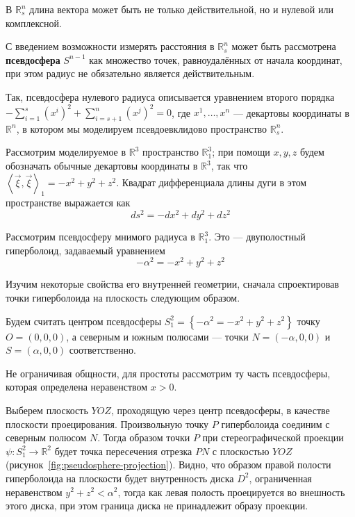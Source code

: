 \documentclass{article}
\numberwithin{equation}{section}
\newcommand{\neword}[1]{\textbf{#1}}
\newcommand{\scalmult}[2]{{\left \langle #1 \right \rangle}_{#2}}
\begin{document}
В $\mathbb{R}^n_s$ длина вектора может быть не только действительной,
но и нулевой или комплексной.

С введением возможности измерять расстояния в $\mathbb{R}^n_s$ может
быть рассмотрена \neword{псевдосфера} $S^{n-1}$ как множество точек,
равноудалённых от начала координат, при этом радиус не обязательно
является действительным.

Так, псевдосфера нулевого радиуса описывается уравнением второго порядка
$-\sum_{i=1}^s\left (x^i \right)^2 + \sum_{i=s+1}^n\left(x^j \right)^2 = 0$, где
$x^1, \dotsc, x^n $ — декартовы координаты в $\mathbb{R}^n$, в котором
мы моделируем псевдоевклидово пространство $\mathbb{R}^n_s$.

Рассмотрим моделируемое в $\mathbb{R}^3$ пространство
$\mathbb{R}^3_1$; при помощи $x, y, z$ будем обозначать обычные
декартовы координаты в $\mathbb{R}^3$, так что $\scalmult{\vec{\xi},
  \vec{\xi}}{1} = -x^2 + y^2 + z^2$. Квадрат дифференциала длины дуги
в этом пространстве выражается как
\begin{equation}\label{eq:R^3_1-linear-element}
  ds^2 = -dx^2 + dy^2 + dz^2
\end{equation}

Рассмотрим псевдосферу мнимого радиуса в $\mathbb{R}^3_1$. Это —
двуполостный гиперболоид, задаваемый уравнением
\begin{equation}\label{eq:pseudosphere}
  -\alpha^2 = -x^2 +y^2 + z^2
\end{equation}

Изучим некоторые свойства его внутренней геометрии,
сначала спроектировав точки гиперболоида на плоскость следующим
образом.

Будем считать центром псевдосферы $S^2_1=\left \{-\alpha^2 = -x^2 + y^2 +
  z^2\right \}$ точку $O=(0, 0, 0)$, а северным и южным полюсами — точки
$N=(-\alpha, 0, 0)$ и $S=(\alpha, 0, 0)$ соответственно.



Не ограничивая общности, для простоты рассмотрим ту часть псевдосферы,
которая определена неравенством $x>0$.

Выберем плоскость $YOZ$, проходящую через центр псевдосферы, в
качестве плоскости проецирования. Произвольную точку $P$ гиперболоида
соединим с северным полюсом $N$. Тогда образом точки $P$ при
стереографической проекции $\psi \colon S^2_1 \to \mathbb{R}^2$ будет
точка пересечения отрезка $PN$ с плоскостью $YOZ$
(рисунок \ref{fig:pseudosphere-projection}). Видно, что образом правой
полости гиперболоида на плоскости будет внутренность диска $D^2$,
ограниченная неравенством $y^2 + z^2 < \alpha^2$, тогда как левая
полость проецируется во внешность этого диска, при этом граница диска
не принадлежит образу проекции.
\end{document}
